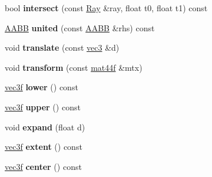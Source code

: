 \begin{DoxyCompactItemize}
\item 
\hypertarget{classps_1_1base_1_1AABB_ad1a26b813b04c38b66990c3c9ae95498}{}bool {\bfseries intersect} (const \hyperlink{classps_1_1base_1_1Ray}{Ray} \&ray, float t0, float t1) const \label{classps_1_1base_1_1AABB_ad1a26b813b04c38b66990c3c9ae95498}

\item 
\hypertarget{classps_1_1base_1_1AABB_a7ff5cdac8ad71f886314427621880692}{}\hyperlink{classps_1_1base_1_1AABB}{A\+A\+B\+B} {\bfseries united} (const \hyperlink{classps_1_1base_1_1AABB}{A\+A\+B\+B} \&rhs) const \label{classps_1_1base_1_1AABB_a7ff5cdac8ad71f886314427621880692}

\item 
\hypertarget{classps_1_1base_1_1AABB_a6e0a8b1cd74335409764c0ad668e3672}{}void {\bfseries translate} (const \hyperlink{classps_1_1base_1_1Vec3}{vec3} \&d)\label{classps_1_1base_1_1AABB_a6e0a8b1cd74335409764c0ad668e3672}

\item 
\hypertarget{classps_1_1base_1_1AABB_a04e2a65274fe57893554ab750bcb6c42}{}void {\bfseries transform} (const \hyperlink{classps_1_1base_1_1Matrix}{mat44f} \&mtx)\label{classps_1_1base_1_1AABB_a04e2a65274fe57893554ab750bcb6c42}

\item 
\hypertarget{classps_1_1base_1_1AABB_a2cfeba4f0ea377a81d4836599faae23e}{}\hyperlink{classps_1_1base_1_1Vec3}{vec3f} {\bfseries lower} () const \label{classps_1_1base_1_1AABB_a2cfeba4f0ea377a81d4836599faae23e}

\item 
\hypertarget{classps_1_1base_1_1AABB_ae9b8e09364a05b36fc994cfd78186a25}{}\hyperlink{classps_1_1base_1_1Vec3}{vec3f} {\bfseries upper} () const \label{classps_1_1base_1_1AABB_ae9b8e09364a05b36fc994cfd78186a25}

\item 
\hypertarget{classps_1_1base_1_1AABB_a178a579406abb3aa4461b376445a5b17}{}void {\bfseries expand} (float d)\label{classps_1_1base_1_1AABB_a178a579406abb3aa4461b376445a5b17}

\item 
\hypertarget{classps_1_1base_1_1AABB_a343c4d7ff970f350511defb7b4beb0d5}{}\hyperlink{classps_1_1base_1_1Vec3}{vec3f} {\bfseries extent} () const \label{classps_1_1base_1_1AABB_a343c4d7ff970f350511defb7b4beb0d5}

\item 
\hypertarget{classps_1_1base_1_1AABB_a3b3b4c49b9449c4bff38c48918cbda5e}{}\hyperlink{classps_1_1base_1_1Vec3}{vec3f} {\bfseries center} () const \label{classps_1_1base_1_1AABB_a3b3b4c49b9449c4bff38c48918cbda5e}


\end{DoxyCompactItemize}
